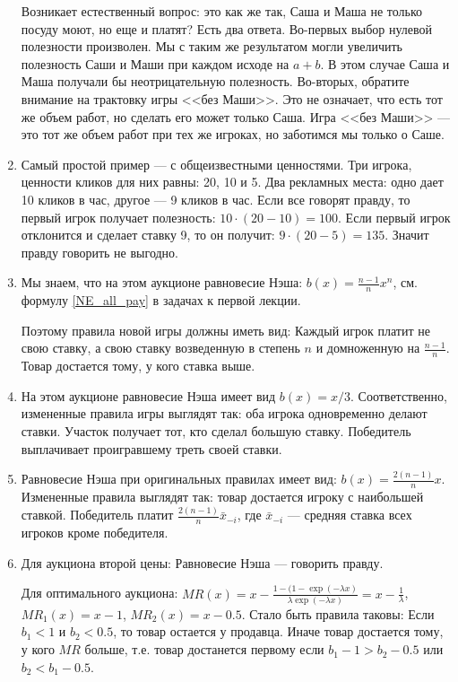 \begin{enumerate}
Возникает естественный вопрос: это как же так, Саша и Маша не только посуду моют, но еще и платят? Есть два ответа. Во-первых выбор нулевой полезности произволен. Мы с таким же результатом могли увеличить полезность Саши и Маши при каждом исходе на $ a+b $. В этом случае Саша и Маша получали бы неотрицательную полезность. Во-вторых, обратите внимание на трактовку игры <<без Маши>>. Это не означает, что есть тот же объем работ, но сделать его может только Саша. Игра <<без Маши>> --- это тот же объем работ при тех же игроках, но заботимся мы только о Саше. 

\item Самый простой пример --- с общеизвестными ценностями. Три игрока, ценности кликов для них равны: 20, 10 и 5. Два рекламных места: одно дает 10 кликов в час, другое --- 9 кликов в час. Если все говорят правду, то первый игрок получает полезность: $ 10\cdot (20-10)=100 $. Если первый игрок отклонится и сделает ставку 9, то он получит: $ 9\cdot (20-5)=135 $. Значит правду говорить не выгодно.

\item Мы знаем, что на этом аукционе равновесие Нэша: $ b(x)=\frac{n-1}{n}x^{n} $, см. формулу \ref{NE_all_pay} в задачах к первой лекции. 

Поэтому правила новой игры должны иметь вид: Каждый игрок платит не свою ставку, а свою ставку возведенную в степень $ n $ и домноженную на $ \frac{n-1}{n} $. Товар достается тому, у кого ставка выше.


\item На этом аукционе равновесие Нэша имеет вид $ b(x)=x/3 $. Соответственно, измененные правила игры выглядят так: оба игрока одновременно делают ставки. Участок получает тот, кто сделал большую ставку. Победитель выплачивает проигравшему треть своей ставки.

\item Равновесие Нэша при оригинальных правилах имеет вид: $ b(x)=\frac{2(n-1)}{n}x $. Измененные правила выглядят так: товар достается игроку с наибольшей ставкой. Победитель платит $ \frac{2(n-1)}{n}\bar{x}_{-i} $, где $ \bar{x}_{-i} $ --- средняя ставка всех игроков кроме победителя.

\item Для аукциона второй цены: Равновесие Нэша --- говорить правду.

Для оптимального аукциона: $ MR(x)=x-\frac{1-(1-\exp(-\lambda x)}{\lambda \exp(-\lambda x)}=x-\frac{1}{\lambda} $, $ MR_{1}(x)=x-1 $, $ MR_{2}(x)=x-0.5 $.  Стало быть правила таковы: Если $ b_{1}<1 $ и $ b_{2}<0.5 $, то товар остается у продавца. Иначе товар достается тому, у кого $ MR $ больше, т.е. товар достанется первому если $ b_{1}-1>b_{2}-0.5 $ или $ b_{2}<b_{1}-0.5 $.


\end{enumerate}
